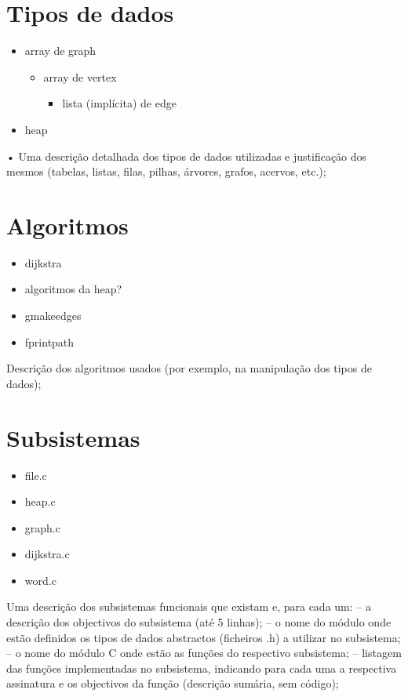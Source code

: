 \documentclass[a4paper, 18pt]{article}
\begin{document}
\section{Tipos de dados}
	\begin{itemize}
		\item array de graph
		\begin{itemize}
			\item array de vertex
			\begin{itemize}
				\item lista (implícita) de edge
			\end{itemize}
		\end{itemize}

		\item heap
	\end{itemize}
• Uma descrição detalhada dos tipos de dados utilizadas e justificação dos mesmos
(tabelas, listas, filas, pilhas, árvores, grafos, acervos, etc.);

\section{Algoritmos}
	\begin{itemize}
		\item dijkstra
		\item algoritmos da heap?
		\item g\textunderscore make\textunderscore edges
		\item fprint\textunderscore path
	\end{itemize}
	\par
	Descrição dos algoritmos usados (por exemplo, na manipulação dos tipos de dados);

\section{Subsistemas}
	\begin{itemize}
		\item file.c
		\item heap.c
		\item graph.c
		\item dijkstra.c
		\item word.c
	\end{itemize}
	\par
	Uma descrição dos subsistemas funcionais que existam e, para cada um:
	– a descrição dos objectivos do subsistema (até 5 linhas);
	– o nome do módulo onde estão definidos os tipos de dados abstractos
	  (ficheiros .h) a utilizar no subsistema;
	– o nome do módulo C onde estão as funções do respectivo subsistema;
	– listagem das funções implementadas no subsistema, indicando para cada uma a
	  respectiva assinatura e os objectivos da função (descrição sumária, sem código);
\end{document}
